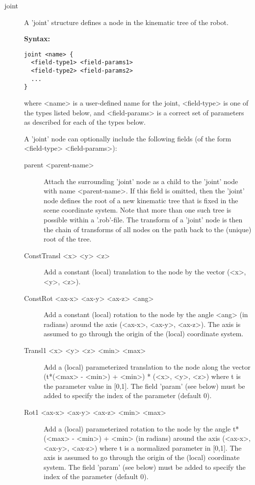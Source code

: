 \documentclass[letter,12pt]{article}
\begin{document}
\begin{description}
  
\item[joint] A 'joint' structure defines a node in the kinematic tree
  of the robot.

{\bf Syntax:}
\begin{verbatim}
joint <name> {
  <field-type1> <field-params1>
  <field-type2> <field-params2>
  ...
}
\end{verbatim}
  
  where <name> is a user-defined name for the joint, <field-type> is
  one of the types listed below, and <field-params> is a correct set of
  parameters as described for each of the types below.
  
  A 'joint' node can optionally include the following fields
  (of the form <field-type> <field-params>):

\begin{description}
  
\item[parent <parent-name>] Attach the surrounding 'joint' node as a
  child to the 'joint' node with name <parent-name>.  If this field is
  omitted, then the 'joint' node defines the root of a new kinematic
  tree that is fixed in the scene coordinate system.  Note that more
  than one such tree is possible within a '.rob'-file.  The transform
  of a 'joint' node is then the chain of transforms of all nodes on
  the path back to the (unique) root of the tree.
  
\item[ConstTransl <x> <y> <z>] Add a constant (local) translation to
  the node by the vector (<x>, <y>, <z>).
  
\item[ConstRot <ax-x> <ax-y> <ax-z> <ang>] Add a constant (local)
  rotation to the node by the angle <ang> (in radians) around the axis
  (<ax-x>, <ax-y>, <ax-z>).  The axis is assumed to go through the
  origin of the (local) coordinate system.
  
\item[Transl1 <x> <y> <z> <min> <max>] Add a (local) parameterized
  translation to the node along the vector (t*(<max> - <min>) + <min>)
  * (<x>, <y>, <z>) where t is the parameter value in [0,1].  The
  field 'param' (see below) must be added to specify the index of the
  parameter (default 0).
  
\item[Rot1 <ax-x> <ax-y> <ax-z> <min> <max>] Add a (local)
  parameterized rotation to the node by the angle t*(<max> - <min>) +
  <min> (in radians) around the axis (<ax-x>, <ax-y>, <ax-z>) where t
  is a normalized parameter in [0,1].  The axis is assumed to go
  through the origin of the (local) coordinate system.  The field
  'param' (see below) must be added to specify the index of the
  parameter (default 0).
  

\end{description}
\end{description}
\end{document}
